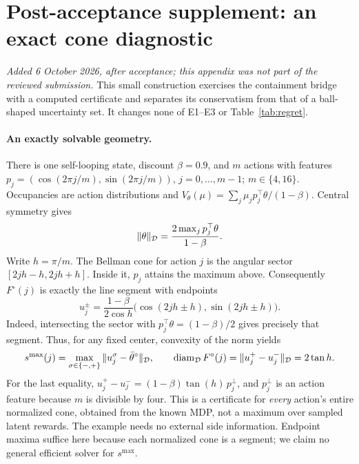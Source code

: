 \section{Post-acceptance supplement: an exact cone diagnostic}
\label{app:exact-toy}

\textit{Added 6 October 2026, after acceptance; this appendix was not part of
the reviewed submission.} This small construction exercises the containment
bridge with a computed certificate and separates its conservatism from that
of a ball-shaped uncertainty set. It changes none of E1--E3 or Table~\ref{tab:regret}.

\paragraph{An exactly solvable geometry.}
There is one self-looping state, discount $\beta=0.9$, and $m$ actions with
features $p_j=(\cos(2\pi j/m),\sin(2\pi j/m))$, $j=0,\ldots,m-1$;
$m\in\{4,16\}$. Occupancies are action distributions and
$V_\theta(\mu)=\sum_j\mu_j p_j^\top\theta/(1-\beta)$.
Central symmetry gives
\[
 \|\theta\|_{\mathcal D}=\frac{2\max_j p_j^\top\theta}{1-\beta}.
\]
Write $h=\pi/m$. The Bellman cone for action $j$ is the angular sector
$[2jh-h,2jh+h]$. Inside it, $p_j$ attains the maximum above. Consequently
$F^\circ(j)$ is exactly the line segment with endpoints
\[
 u_j^\pm=\frac{1-\beta}{2\cos h}
       \big(\cos(2jh\pm h),\sin(2jh\pm h)\big).
\]
Indeed, intersecting the sector with $p_j^\top\theta=(1-\beta)/2$ gives
precisely that segment. Thus, for any fixed center, convexity of the norm yields
\[
 s^{\max}(j)=\max_{\sigma\in\{-,+\}}
                 \|u_j^\sigma-\bar\theta^\circ\|_{\mathcal D},
 \qquad
 \operatorname{diam}_{\mathcal D}F^\circ(j)
 =\|u_j^+-u_j^-\|_{\mathcal D}=2\tan h.
\]
For the last equality, $u_j^+-u_j^-=(1-\beta)\tan(h)\,p_j^\perp$, and
$p_j^\perp$ is an action feature because $m$ is divisible by four. This is a
certificate for \emph{every} action's entire normalized cone, obtained from the
known MDP, not a maximum over sampled latent rewards. The example needs no
external side information. Endpoint maxima suffice here because each
normalized cone is a segment; we claim no general efficient solver for
$s^{\max}$.

